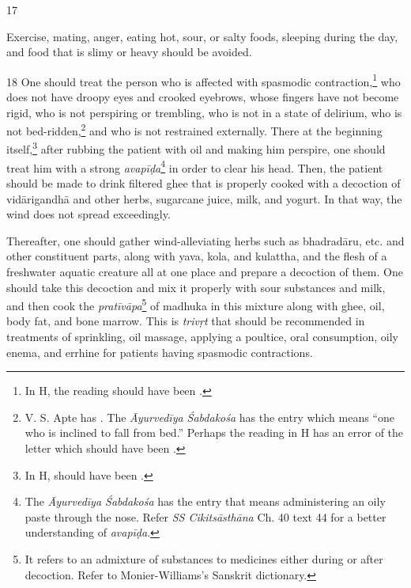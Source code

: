 \begin{translation}
    \item[17]
    \begin{sloka}
     Exercise, mating, anger, eating hot, sour, or salty foods, sleeping during the day, and food that is slimy or heavy should be avoided.
\end{sloka}

    \item[18]
    One should treat the person who is affected with spasmodic contraction,\footnote{In H, the reading  should have been .} who does not have droopy eyes and crooked eyebrows, whose fingers have not become rigid, who is not perspiring or trembling, who is not in a state of delirium, who is not bed-ridden,\footnote{V. S. Apte has . The \textit{Āyurvedīya \'{S}abdakośa} has the entry  which means \enquote{one who is inclined to fall from bed.} Perhaps the reading in H has an error of the letter  which should have been .} and who is not restrained externally. There at the beginning itself,\footnote{In H,  should have been .} after rubbing the patient with oil and making him perspire, one should treat him with a strong \textit{avapīḍa}\footnote{The \textit{Āyurvedīya \'{S}abdakośa} has the entry  that means administering an oily paste through the nose. Refer \textit{SS Cikitsāsthāna} Ch. 40 text 44 for a better understanding of \textit{avapīḍa}.} in order to clear his head. Then, the patient should be made to drink filtered ghee that is properly cooked with a decoction of \gls{vidārigandhā} and other herbs, sugarcane juice, milk, and yogurt. In that way, the wind does not spread exceedingly. 

    Thereafter, one should gather wind-alleviating herbs such as \gls{bhadradāru}, etc. and other constituent parts, along with \gls{yava}, \gls{kola}, and \gls{kulattha}, and the flesh of a freshwater aquatic creature all at one place and prepare a decoction of them. One should take this decoction and mix it properly with sour substances and milk, and then cook the \textit{pratīvāpa}\footnote{It refers to an admixture of substances to medicines either during or after decoction. Refer to Monier-Williams's Sanskrit dictionary.} of \gls{madhuka} in this mixture along with ghee, oil, body fat, and bone marrow. This is \textit{trivṛt} that should be recommended in treatments of sprinkling, oil massage, applying a poultice, oral consumption, oily enema, and errhine for patients having spasmodic contractions.


\end{translation}
